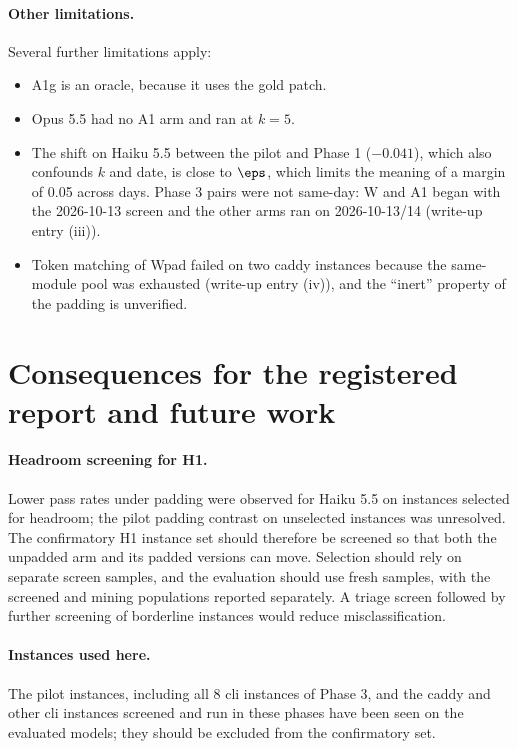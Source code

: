 \paragraph{Other limitations.} Several further limitations apply:
\begin{itemize}
\item A1g is an oracle, because it uses the gold patch.
\item Opus 5.5 had no A1 arm and ran at $k=5$.
\item The shift on Haiku 5.5 between the pilot and Phase 1 ($-0.041$), which also confounds $k$ and date, is close to $\eps$, which limits the meaning of a margin of 0.05 across days. Phase 3 pairs were not same-day: W and A1 began with the 2026-10-13 screen and the other arms ran on 2026-10-13/14 (write-up entry (iii)).
\item Token matching of Wpad failed on two caddy instances because the same-module pool was exhausted (write-up entry (iv)), and the ``inert'' property of the padding is unverified.
\end{itemize}

\section{Consequences for the registered report and future work}

\paragraph{Headroom screening for H1.} Lower pass rates under padding were observed for Haiku 5.5 on instances selected for headroom; the pilot padding contrast on unselected instances was unresolved. The confirmatory H1 instance set should therefore be screened so that both the unpadded arm and its padded versions can move. Selection should rely on separate screen samples, and the evaluation should use fresh samples, with the screened and mining populations reported separately. A triage screen followed by further screening of borderline instances would reduce misclassification.

\paragraph{Instances used here.} The pilot instances, including all 8 cli instances of Phase 3, and the caddy and other cli instances screened and run in these phases have been seen on the evaluated models; they should be excluded from the confirmatory set.

